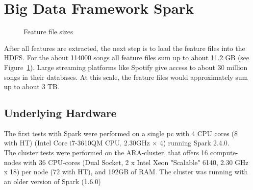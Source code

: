 \section{Big Data Framework Spark}\label{bds1}

\begin{figure}[htbp]
	\centering
	\caption{Feature file sizes}
	\label{filesize}
\end{figure}

\noindent After all features are extracted, the next step is to load the feature files into the HDFS.
For the about 114000 songs all feature files sum up to about 11.2 GB (see Figure~\ref{filesize}). 
\noindent Large streaming platforms like Spotify give access to about 30 million songs in their databases. At this scale, the feature files would approximately sum up to about 3 TB.\\

\subsection{Underlying Hardware}

The first tests with Spark were performed on a single pc with 4 CPU cores (8 with HT) (Intel Core i7-3610QM CPU, 2.30GHz × 4) running Spark 2.4.0.\\ The cluster tests were performed on the ARA-cluster, that offers 16 compute-nodes with 36 CPU-cores (Dual Socket, 2 x Intel Xeon "Scalable" 6140, 2.30 GHz x 18) per node (72 with HT), and 192GB of RAM. The cluster was running with an older version of Spark (1.6.0)\\


